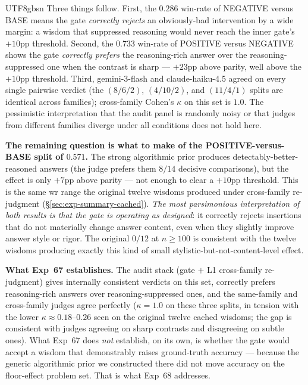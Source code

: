 \documentclass{article}
\begin{document}
\begin{CJK*}{UTF8}{gbsn}
Three things follow. First, the \(0.286\) win-rate of NEGATIVE
versus BASE means the gate \emph{correctly rejects} an obviously-bad
intervention by a wide margin: a wisdom that suppressed reasoning
would never reach the inner gate's \(+10\)pp threshold. Second,
the \(0.733\) win-rate of POSITIVE versus NEGATIVE shows the gate
\emph{correctly prefers} the reasoning-rich answer over the
reasoning-suppressed one when the contrast is sharp ---
\(+23\)pp above parity, well above the \(+10\)pp threshold. Third,
gemini-3-flash and claude-haiku-4.5 agreed on every single pairwise
verdict (the \((8/6/2)\), \((4/10/2)\), and \((11/4/1)\) splits are
identical across families); cross-family Cohen's \(\kappa\) on
this set is \(1.0\). The pessimistic interpretation that the audit
panel is randomly noisy or that judges from different families
diverge under all conditions does not hold here.

\textbf{The remaining question is what to make of the
POSITIVE-versus-BASE split of \(0.571\).} The strong algorithmic
prior produces detectably-better-reasoned answers (the judge prefers
them \(8/14\) decisive comparisons), but the effect is only
\(+7\)pp above parity --- not enough to clear a \(+10\)pp threshold.
This is the same wr range the original twelve wisdoms produced
under cross-family re-judgment (\S\ref{sec:exp-summary-cached}).
\emph{The most parsimonious interpretation of both results is that
the gate is operating as designed}: it correctly rejects insertions
that do not materially change answer content, even when they
slightly improve answer style or rigor. The original \(0/12\) at
\(n \geq 100\) is consistent with the twelve wisdoms producing
exactly this kind of small stylistic-but-not-content-level effect.

\textbf{What Exp~67 establishes.} The audit stack (gate \(+\) L1
cross-family re-judgment) gives internally consistent verdicts on
this set, correctly prefers reasoning-rich answers over
reasoning-suppressed ones, and the same-family and cross-family
judges agree perfectly (\(\kappa = 1.0\) on these three splits,
in tension with the lower \(\kappa\approx 0.18\)--\(0.26\) seen
on the original twelve cached wisdoms; the gap is consistent
with judges agreeing on sharp contrasts and disagreeing on
subtle ones). What Exp~67 does \emph{not} establish, on its
own, is whether the gate would accept a wisdom that
demonstrably raises ground-truth accuracy --- because the
generic algorithmic prior we constructed there did not move
accuracy on the floor-effect problem set. That is what Exp~68
addresses.


\end{CJK*}
\end{document}
